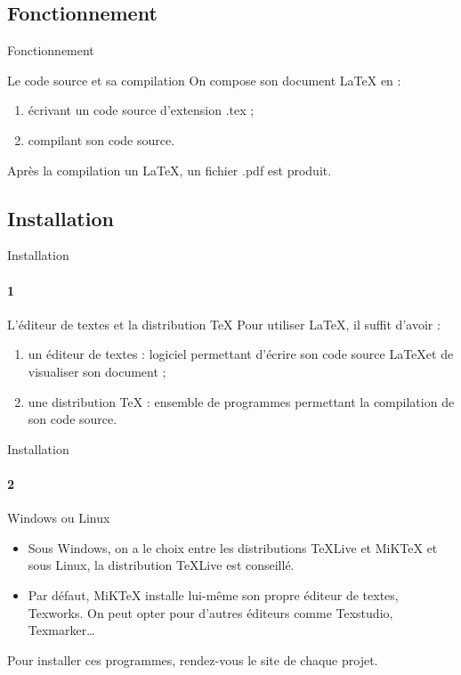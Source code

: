 \documentclass[17pt]{beamer}
\newcommand{\bleu}[1]{\textcolor{blue!75!black}{#1}}
\begin{document}
\subsection{Fonctionnement}

\begin{frame}{Fonctionnement}
\begin{block}{Le code source et sa compilation}
On compose son document \LaTeX{} en : 
\begin{enumerate}
\item écrivant un \bleu{code source} d'extension \bleu{.tex} ;
\item \bleu{compilant} son code source. 
\end{enumerate}

Après la compilation un \LaTeX, un fichier \bleu{.pdf} est produit.
\end{block}
\end{frame}

\subsection{Installation}

\begin{frame}{Installation}
\framesubtitle{1}
\begin{block}{L'éditeur de textes et la distribution \TeX}
Pour utiliser \LaTeX, il suffit d'avoir :

\begin{enumerate}
\item \bleu{un éditeur de textes} : logiciel permettant d'écrire son code source \LaTeX et de visualiser son document ; 
\item \bleu{une distribution \TeX} :  ensemble de programmes permettant la compilation de son code source.
\end{enumerate}
\end{block}
\end{frame}

\begin{frame}{Installation}
\framesubtitle{2}
\begin{block}{Windows ou Linux}
\begin{itemize}
\item Sous Windows, on a le choix entre les distributions \TeX Live et MiK\TeX{} et sous Linux, la distribution \TeX Live est conseillé.
\item Par défaut, MiK\TeX{} installe lui-même son propre éditeur de textes, Texworks. On peut opter pour d'autres éditeurs comme Texstudio, Texmarker\dots
\end{itemize}
Pour installer ces programmes, rendez-vous le site de chaque projet.
\end{block}
\end{frame}
\end{document}
